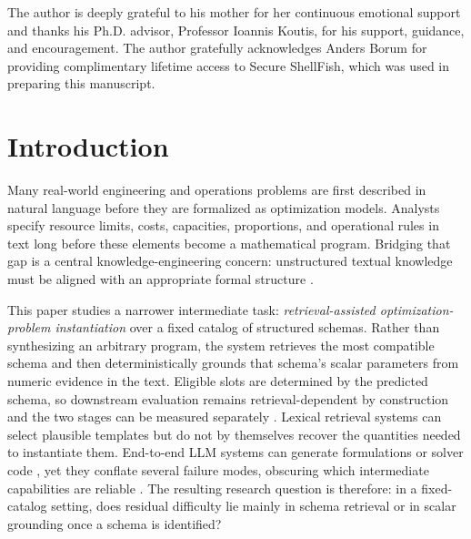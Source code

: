 \documentclass[pdflatex,sn-basic,Numbered]{sn-jnl}
\begin{document}

\maketitle


The author is deeply grateful to his mother for her continuous emotional support and thanks his Ph.D. advisor, Professor Ioannis Koutis, for his support, guidance, and encouragement. The author gratefully acknowledges Anders Borum for providing complimentary lifetime access to Secure ShellFish, which was used in preparing this manuscript.

\section{Introduction}

Many real-world engineering and operations problems are first described in natural language before they are formalized as optimization models. Analysts specify resource limits, costs, capacities, proportions, and operational rules in text long before these elements become a mathematical program. Bridging that gap is a central knowledge-engineering concern: unstructured textual knowledge must be aligned with an appropriate formal structure \cite{affolter2019nli,ramamonjison2022autoformulation,ramamonjison2023nl4opt}.

This paper studies a narrower intermediate task: \emph{retrieval-assisted optimization-problem instantiation} over a fixed catalog of structured schemas. Rather than synthesizing an arbitrary program, the system retrieves the most compatible schema and then deterministically grounds that schema's scalar parameters from numeric evidence in the text. Eligible slots are determined by the predicted schema, so downstream evaluation remains retrieval-dependent by construction and the two stages can be measured separately \cite{nlp4lp_dataset,ahmaditeshnizi2024optimus_icml,sheetrit2024rematch}. Lexical retrieval systems can select plausible templates but do not by themselves recover the quantities needed to instantiate them. End-to-end LLM systems can generate formulations or solver code \cite{ahmaditeshnizi2024optimus_icml,zhang2024optllm,ahmed2025opt2code}, yet they conflate several failure modes, obscuring which intermediate capabilities are reliable \cite{astorga2025autoformulation,huang2025orlm,lu2025optmath}. The resulting research question is therefore: in a fixed-catalog setting, does residual difficulty lie mainly in schema retrieval or in scalar grounding once a schema is identified?
\end{document}
